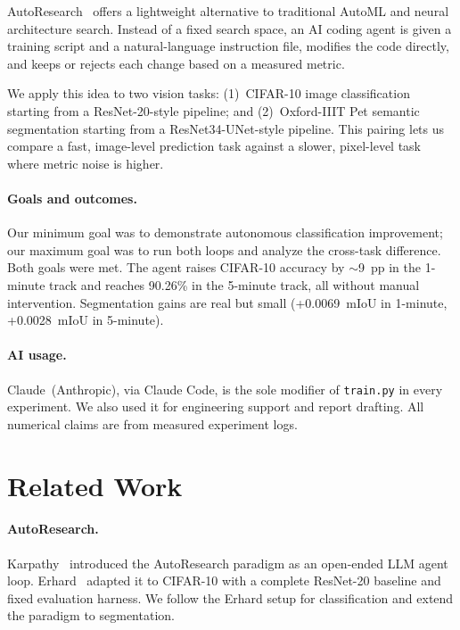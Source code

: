 \documentclass[10pt,twocolumn,letterpaper]{article}
\begin{document}
AutoResearch~\cite{karpathy2026autoresearch,
erhard2025autoresearch_cifar10} offers a lightweight alternative to
traditional AutoML and neural architecture search.
Instead of a fixed search space, an AI coding agent is given a
training script and a natural-language instruction file, modifies the
code directly, and keeps or rejects each change based on a measured
metric.

We apply this idea to two vision tasks:
(1)~CIFAR-10 image classification starting from a ResNet-20-style
pipeline; and
(2)~Oxford-IIIT Pet semantic segmentation starting from a
ResNet34-UNet-style pipeline.
This pairing lets us compare a fast, image-level prediction task
against a slower, pixel-level task where metric noise is higher.

\paragraph{Goals and outcomes.}
Our minimum goal was to demonstrate autonomous classification
improvement; our maximum goal was to run both loops and analyze the
cross-task difference.
Both goals were met.
The agent raises CIFAR-10 accuracy by $\sim$9~pp in the 1-minute track
and reaches 90.26\% in the 5-minute track, all without manual
intervention.
Segmentation gains are real but small (+0.0069~mIoU in 1-minute,
+0.0028~mIoU in 5-minute).

\paragraph{AI usage.}
Claude~(Anthropic), via Claude Code, is the sole modifier of
\texttt{train.py} in every experiment.
We also used it for engineering support and report drafting.
All numerical claims are from measured experiment logs.

\section{Related Work}

\paragraph{AutoResearch.}
Karpathy~\cite{karpathy2026autoresearch} introduced the AutoResearch
paradigm as an open-ended LLM agent loop.
Erhard~\cite{erhard2025autoresearch_cifar10} adapted it to CIFAR-10
with a complete ResNet-20 baseline and fixed evaluation harness.
We follow the Erhard setup for classification and extend the paradigm
to segmentation.
\end{document}

